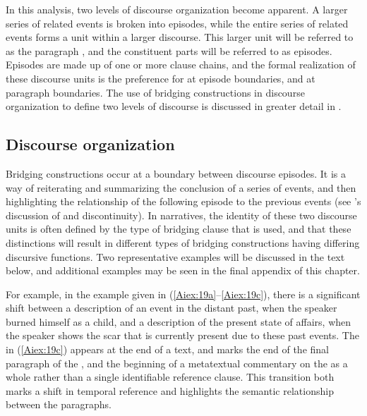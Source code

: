 \documentclass[output=paper]{LSP/langsci}
\begin{document}
In this analysis, two levels of discourse organization become apparent. A larger series of related events is broken into episodes, while the entire series of related events forms a  unit within a larger discourse. This larger unit will be referred to as the paragraph \citep[corresponding to the idea of a paragraph in][372]{Thompson.et.al.2007}, and the constituent parts will be referred to as episodes. Episodes are made up of one or more clause chains, and the formal realization of these discourse units is the preference for  at episode boundaries, and  at paragraph boundaries. The use of bridging constructions in discourse organization to define two levels of discourse is discussed in greater detail in \citet{Aiton.2015}.

\subsection{Discourse organization} 
\label{Aidiscourse.org}
Bridging constructions occur at a boundary between discourse episodes. It is a way of reiterating and summarizing the conclusion of a series of events, and then highlighting the relationship of the following episode to the previous events (see \citealt{devries.2005}’s discussion of  and discontinuity). In  narratives, the identity of these two discourse units is often defined by the type of bridging clause that is used, and that these distinctions will result in different types of bridging constructions having differing discursive functions. Two representative examples will be discussed in the text below, and additional examples may be seen in the final appendix of this chapter.

	For example, in the example given in (\ref{Aiex:19a}--\ref{Aiex:19c}), there is a significant shift between a description of an event in the distant past, when the speaker burned himself as a child, and a description of the present state of affairs, when the speaker shows the scar that is currently present due to these past events. The  in (\ref{Aiex:19c}) appears at the end of a text, and marks the end of the final paragraph of the , and the beginning of a metatextual commentary on the  as a whole rather than a single identifiable reference clause. This transition both marks a shift in temporal reference and highlights the semantic relationship between the paragraphs.
	
\end{document}
